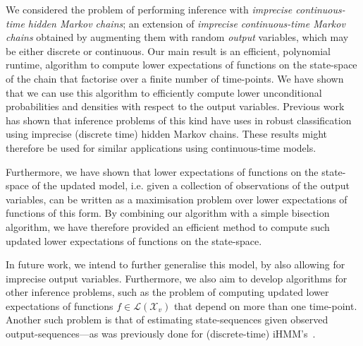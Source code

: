 \documentclass[3p]{elsarticle}
\newcommand{\states}{\mathcal{X}}
\newcommand{\gambles}{\mathcal{L}}
\begin{document}
We considered the problem of performing inference with \emph{imprecise continuous-time hidden Markov chains}; an extension of \emph{imprecise continuous-time Markov chains} obtained by augmenting them with random \emph{output} variables, which may be either discrete or continuous.
Our main result is an efficient, polynomial runtime, algorithm to compute lower expectations of functions on the state-space of the chain that factorise over a finite number of time-points. We have shown that we can use this algorithm to efficiently compute lower unconditional probabilities and densities with respect to the output variables. Previous work~\cite{soullard2017} has shown that inference problems of this kind have uses in robust classification using imprecise (discrete time) hidden Markov chains. These results might therefore be used for similar applications using continuous-time models.

Furthermore, we have shown that lower expectations of functions on the state-space of the updated model, i.e. given a collection of observations of the output variables, can be written as a maximisation problem over lower expectations of functions of this form. By combining our algorithm with a simple bisection algorithm, we have therefore provided an efficient method to compute such updated lower expectations of functions on the state-space.

In future work, we intend to further generalise this model, by also allowing for imprecise output variables. Furthermore, we also aim to develop algorithms for other inference problems,
such as the problem of computing updated lower expectations of functions $f\in\gambles(\states_v)$ that depend on more than one time-point. Another such problem is that of estimating state-sequences given observed output-sequences---as was previously done for (discrete-time) iHMM's~\citep{DeBock:2014ts}. %
\vspace{-9pt}


\appendix

\end{document}
